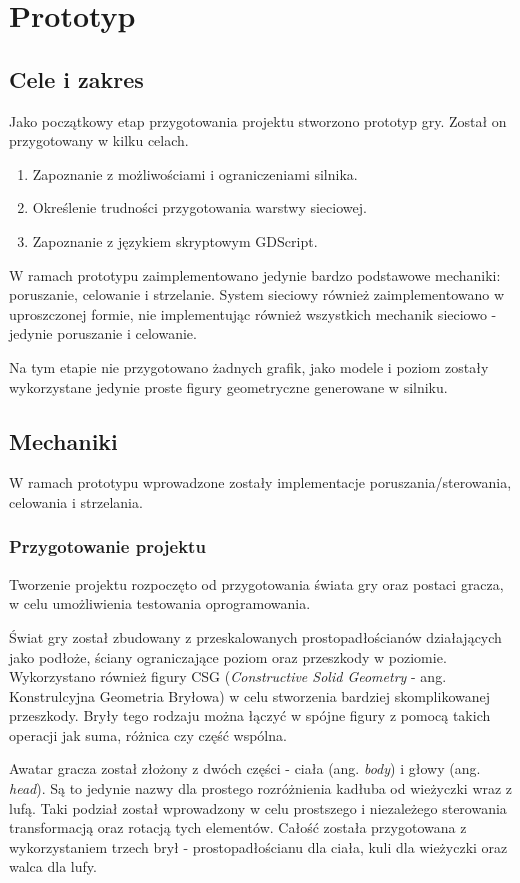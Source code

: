 \chapter{Prototyp}
\section{Cele i zakres}
Jako początkowy etap przygotowania projektu stworzono prototyp gry. Został on przygotowany w kilku celach.
\begin{enumerate}
    \item Zapoznanie z możliwościami i ograniczeniami silnika. 
    \item Określenie trudności przygotowania warstwy sieciowej.
    \item Zapoznanie z językiem skryptowym GDScript. 
\end{enumerate}

W ramach prototypu zaimplementowano jedynie bardzo podstawowe mechaniki: poruszanie, celowanie i strzelanie. System sieciowy również zaimplementowano w uproszczonej formie, nie implementując również wszystkich mechanik sieciowo - jedynie poruszanie i celowanie.

Na tym etapie nie przygotowano żadnych grafik, jako modele i poziom zostały wykorzystane jedynie proste figury geometryczne generowane w silniku.

\section{Mechaniki}
W ramach prototypu wprowadzone zostały implementacje poruszania/sterowania, celowania i strzelania.

\subsection{Przygotowanie projektu}
Tworzenie projektu rozpoczęto od przygotowania świata gry oraz postaci gracza, w celu umożliwienia testowania oprogramowania. 

Świat gry został zbudowany z przeskalowanych prostopadłościanów działających jako podłoże, ściany ograniczające poziom oraz przeszkody w poziomie. Wykorzystano również figury CSG (\emph{Constructive Solid Geometry} - ang. Konstrulcyjna Geometria Bryłowa) w celu stworzenia bardziej skomplikowanej przeszkody. Bryły tego rodzaju można łączyć w spójne figury z pomocą takich operacji jak suma, różnica czy część wspólna.

Awatar gracza został złożony z dwóch części - ciała (ang. \emph{body}) i głowy (ang. \emph{head}). Są to jedynie nazwy dla prostego rozróżnienia kadłuba od wieżyczki wraz z lufą. Taki podział został wprowadzony w celu prostszego i niezależego sterowania transformacją oraz rotacją tych elementów. Całość została przygotowana z wykorzystaniem trzech brył - prostopadłościanu dla ciała, kuli dla wieżyczki oraz walca dla lufy.


